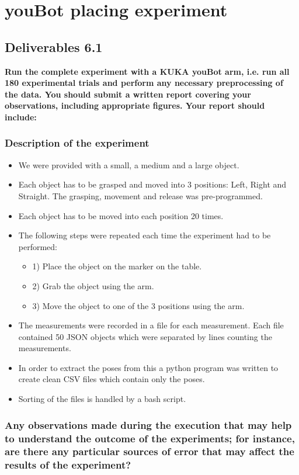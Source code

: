 \chapter{youBot placing experiment}
\section{Deliverables 6.1}
\textbf{Run the complete experiment with a KUKA youBot arm, i.e. run all 180 experimental trials and perform any necessary preprocessing of the data. You should submit a written report covering your observations, including appropriate figures. Your report should include:}

\subsection{Description of the experiment}

\begin{itemize}
	\item We were provided with a small, a medium and a large object.
	\item Each object has to be grasped and moved into 3 positions: Left, Right and Straight. The grasping, movement and release was pre-programmed.
	\item Each object has to be moved into each position 20 times.
	\item The following steps were repeated each time the experiment had to be performed:
	\begin{itemize}
		\item 1) Place the object on the marker on the table.
		\item 2) Grab the object using the arm.
		\item 3) Move the object to one of the 3 positions using the arm.
	\end{itemize}
	\item The measurements were recorded in a file for each measurement. Each file contained 50 JSON objects which were separated by lines counting the measurements.
	\item In order to extract the poses from this a python program was written to create clean CSV files which contain only the poses.
	\item Sorting of the files is handled by a bash script.
\end{itemize}


\subsection{Any observations made during the execution that may help to understand the outcome of the experiments; for instance, are there any particular sources of error that may affect the results of the experiment?}

